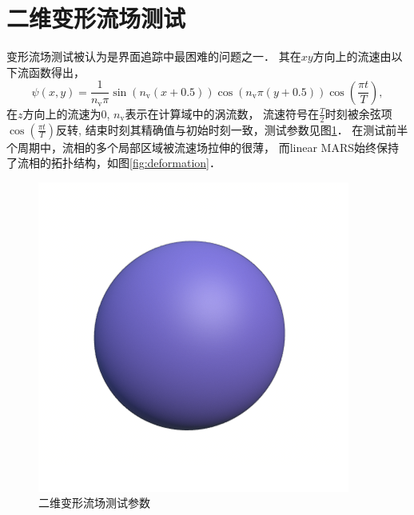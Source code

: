 \section{二维变形流场测试}
变形流场测试被认为是界面追踪中最困难的问题之一．
其在$xy$方向上的流速由以下流函数得出，
\begin{equation*}
\label{eq:deformation}
\psi(x,y)=\frac{1}{n_{\mathrm{v}} \pi}\sin(n_{\mathrm{v}}(x+0.5))\cos(n_{\mathrm{v}}\pi(y+0.5))\cos(\frac{\pi t}{T}),
\end{equation*}
在$z$方向上的流速为$0$, $n_{\mathrm{v}}$表示在计算域中的涡流数，
流速符号在$\frac{T}{2}$时刻被余弦项$\cos(\frac{\pi  t}{T})$反转,
结束时刻其精确值与初始时刻一致，测试参数见图\ref{tab:deformation}．
在测试前半个周期中，流相的多个局部区域被流速场拉伸的很薄，
而linear MARS始终保持了流相的拓扑结构，如图\ref{fig:deformation}．
\begin{figure}[htbp]
	\begin{minipage}[b]{0.65\linewidth}
		\renewcommand{\arraystretch}{1.2}
		\centering
		
	\end{minipage}
	\hfill
	\begin{minipage}{0.3\linewidth}
		\centering
		\includegraphics[width=1\linewidth]{images/3}
	\end{minipage}
	\caption{二维变形流场测试参数}
	\label{tab:deformation}
\end{figure}


